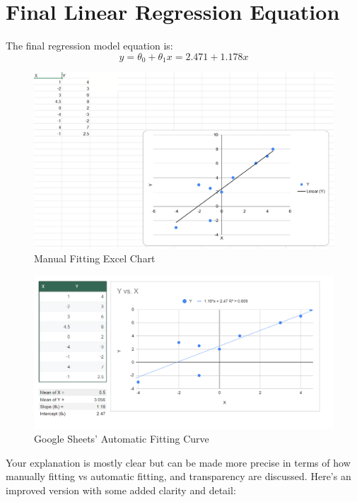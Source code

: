 \documentclass[12pt]{article}
\begin{document}
\section*{Final Linear Regression Equation}
The final regression model equation is:
\[
y = \theta_0 + \theta_1 x = 2.471 + 1.178x
\]
\newpage
\begin{figure}[h]
    \centering
    \includegraphics[width=1.0\textwidth]{Module_1_Assignment_Spreadsheet.png}
    \caption{Manual Fitting Excel Chart}
    \label{fig:regression_optimization_excel}
\end{figure}
\begin{figure}[h]
    \centering
    \includegraphics[width=1.0\textwidth]{Regression Model Optimization_ Manual vs Automated.png}
    \caption{Google Sheets' Automatic Fitting Curve}
    \label{fig:work shown}
\end{figure}
\newpage

Your explanation is mostly clear but can be made more precise in terms of how manually fitting vs automatic fitting, and transparency are discussed. Here's an improved version with some added clarity and detail:
\end{document}
